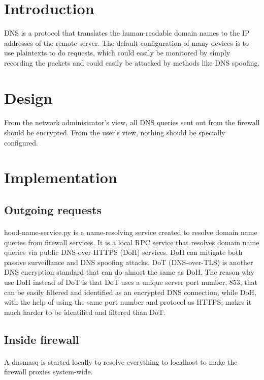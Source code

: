 \documentclass[mscthesis]{usiinfthesis}
\begin{document}
\section{Introduction}
DNS is a protocol that translates the human-readable domain names to the IP addresses of the remote server. The default configuration of many devices is to use plaintexts to do requests, which could easily be monitored by simply recording the packets and could easily be attacked by methods like DNS spoofing.

\section{Design}
\paragraph{}
From the network administrator's view, all DNS queries sent out from the firewall should be encrypted. From the user's view, nothing should be specially configured.

\section{Implementation}
\subsection{Outgoing requests}
\paragraph{}
hood-name-service.py is a name-resolving service created to resolve domain name queries from firewall services. It is a local RPC service that resolves domain name queries via public DNS-over-HTTPS (DoH) services. DoH can mitigate both passive surveillance and DNS spoofing attacks\citep{rfc:doh8}. DoT (DNS-over-TLS) is another DNS encryption standard that can do almost the same as DoH. The reason why use DoH instead of DoT is that DoT uses a unique server port number, 853, that can be easily filtered and identified as an encrypted DNS connection, while DoH, with the help of using the same port number and protocol as HTTPS, makes it much harder to be identified and filtered than DoT.
\subsection{Inside firewall}
\paragraph{}
A dnsmasq is started locally to resolve everything to localhost to make the firewall proxies system-wide.
\end{document}
